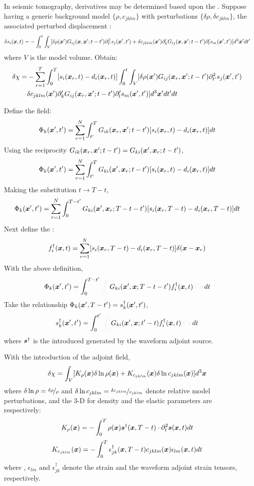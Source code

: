 In seismic tomography,
\Frechet derivatives may be determined based upon the .
Suppose having a generic background model $\{\rho,c_{jklm}\}$
with perturbations $\{\delta\rho,\delta c_{jklm}\}$,
the associated perturbed displacement
:
\[ \delta s_i(\boldsymbol{x},t)=-\int_0^t\int_V[\delta\rho(\boldsymbol{x}')G_{ij}(\boldsymbol{x},\boldsymbol{x}';t-t')\partial_{t'}^2s_j(\boldsymbol{x}',t')+\delta c_{jklm}(\boldsymbol{x}')\partial_k' G_{ij}(\boldsymbol{x},\boldsymbol{x}';t-t')\partial_l' s_m(\boldsymbol{x}',t')]d^3\boldsymbol{x}'dt' \]
where $V$ is the model volume. Obtain:
\begin{align*}
  \delta\chi= & -\sum_{r=1}^T\int_0^T[s_i(\boldsymbol{x}_r,t)-d_i(\boldsymbol{x}_r,t)]\int_0^t\int_V[\delta\rho(\boldsymbol{x}')G_{ij}(\boldsymbol{x}_r,\boldsymbol{x}';t-t')\partial_{t'}^2s_j(\boldsymbol{x}',t') \\
    & \delta c_{jklm}(\boldsymbol{x}')\partial_k' G_{ij}(\boldsymbol{x}_r,\boldsymbol{x}';t-t')\partial_l' s_m(\boldsymbol{x}',t')]d^3\boldsymbol{x}'dt'dt
\end{align*}

Define the field:
\[ \Phi_k(\boldsymbol{x}',t')=\sum_{r=1}^N\int_{t'}^TG_{ik}(\boldsymbol{x}_r,\boldsymbol{x}';t-t')[s_i(\boldsymbol{x}_r,t)-d_i(\boldsymbol{x}_r,t)]dt \]
Using the reciprocity $G_{ik}(\boldsymbol{x}_r,\boldsymbol{x}';t-t')=G_{ki}(\boldsymbol{x}',\boldsymbol{x}_r;t-t')$,
\[ \Phi_k(\boldsymbol{x}',t')=\sum_{r=1}^N\int_{t'}^TG_{ki}(\boldsymbol{x}',\boldsymbol{x}_r;t-t')[s_i(\boldsymbol{x}_r,t)-d_i(\boldsymbol{x}_r,t)]dt \]
Making the substitution $t\rightarrow T-t$,
\[ \Phi_k(\boldsymbol{x}',t')=\sum_{r=1}^N\int_0^{T-t'}G_{ki}(\boldsymbol{x}',\boldsymbol{x}_r;T-t-t')[s_i(\boldsymbol{x}_r,T-t)-d_i(\boldsymbol{x}_r,T-t)]dt \]
Next define the :
\[ f_i^\dagger(\boldsymbol{x},t)=\sum_{r=1}^N[s_i(\boldsymbol{x}_r,T-t)-d_i(\boldsymbol{x}_r,T-t)]\delta(\boldsymbol{x}-\boldsymbol{x}_r) \]
With the above definition,
\[ \Phi_k(\mbf x',t')=\int_0^{T-t'}\myde{\int_V}G_{ki}(\mbf x',\mbf x;T-t-t')f_i^\dagger(\mbf x,t)\myde{d^3\mbf x}dt \]
Take the relationship $\Phi_k(\boldsymbol{x}',T-t')=s_k^\dagger(\boldsymbol{x}',t')$,
\[ s_k^\dagger(\mbf x',t')=\int_0^{t'}\myde{\int_V}G_{ki}(\mbf x',\mbf x;t'-t)f_i^\dagger(\mbf x,t)\myde{d^3\mbf x}dt \]
where $\boldsymbol{s}^\dagger$ is the introduced 
generated by the waveform adjoint source.

With the introduction of the adjoint field,
\[ \delta\chi=\int_V[K_\rho(\boldsymbol{x})\delta\ln\rho(\boldsymbol{x})+K_{c_{jklm}}(\boldsymbol{x})\delta\ln c_{jklm}(\boldsymbol{x})]d^3\boldsymbol{x} \]
where
$\delta\ln\rho=\nicefrac{\delta\rho}{\rho}$ and $\delta\ln c_{jklm}=\nicefrac{\delta c_{jklm}}{c_{jklm}}$
denote relative model perturbations,
and the 3-D 
for density and the elastic parameters are respectively:
\[ K_\rho(\boldsymbol{x})=-\int_0^T\rho(\boldsymbol{x})\boldsymbol{s}^\dagger(\boldsymbol{x},T-t)\cdot\partial_t^2\boldsymbol{s}(\boldsymbol{x},t)dt \]
\[ K_{c_{jklm}}(\boldsymbol{x})=-\int_0^T\epsilon_{jk}^\dagger(\boldsymbol{x},T-t)c_{jklm}(\boldsymbol{x})\epsilon_{lm}(\boldsymbol{x},t)dt \]
where
,
$\epsilon_{lm}$ and $\epsilon_{jk}^\dagger$
denote the strain and the waveform adjoint strain tensors, respectively.


